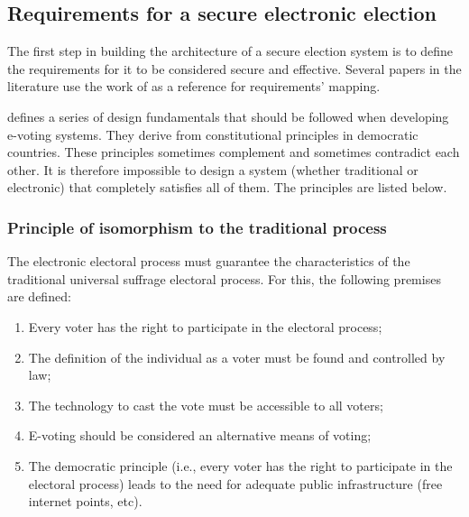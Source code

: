 \documentclass[english]{textolivre}
\begin{document}
\subsection{Requirements for a secure electronic election \label{sec-requirements}}

The first step in building the architecture of a secure election system is to define the requirements for it to be considered secure and effective. Several papers in the literature \cite{Lekkas, Sampigethaya, Hardwick} use the work of \textcite{Gritzalis} as a reference for requirements’ mapping.

\textcite{Gritzalis} defines a series of design fundamentals that should be followed when developing e-voting systems. They derive from constitutional principles in democratic countries. These principles sometimes complement and sometimes contradict each other. It is therefore impossible to design a system (whether traditional or electronic) that completely satisfies all of them. The principles are listed below.

\subsubsection{Principle of isomorphism to the traditional process \label{sec-Principle-Isomorphism}}

The electronic electoral process must guarantee the characteristics of the traditional universal suffrage electoral process. For this, the following premises are defined:

\begin{enumerate}


\item Every voter has the right to participate in the electoral process;

\item The definition of the individual as a voter must be found and controlled by law;

\item The technology to cast the vote must be accessible to all voters;

\item E-voting should be considered an alternative means of voting;

\item The democratic principle (i.e., every voter has the right to participate in the electoral process) leads to the need for adequate public infrastructure (free internet points, etc).

\end{enumerate}
\end{document}
